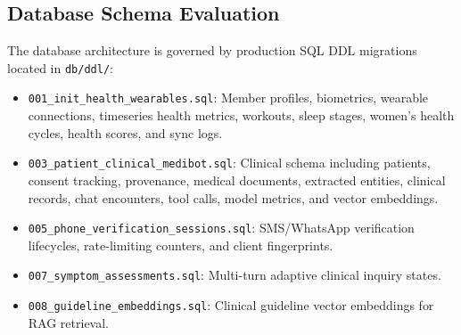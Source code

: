 \documentclass[11pt,a4paper]{article}
\begin{document}
\subsection{Database Schema Evaluation}
The database architecture is governed by production SQL DDL migrations located in \texttt{db/ddl/}:
\begin{itemize}[leftmargin=1.5em]
    \item \texttt{001\_init\_health\_wearables.sql}: Member profiles, biometrics, wearable connections, timeseries health metrics, workouts, sleep stages, women's health cycles, health scores, and sync logs.
    \item \texttt{003\_patient\_clinical\_medibot.sql}: Clinical schema including patients, consent tracking, provenance, medical documents, extracted entities, clinical records, chat encounters, tool calls, model metrics, and vector embeddings.
    \item \texttt{005\_phone\_verification\_sessions.sql}: SMS/WhatsApp verification lifecycles, rate-limiting counters, and client fingerprints.
    \item \texttt{007\_symptom\_assessments.sql}: Multi-turn adaptive clinical inquiry states.
    \item \texttt{008\_guideline\_embeddings.sql}: Clinical guideline vector embeddings for RAG retrieval.
\end{itemize}
\end{document}
